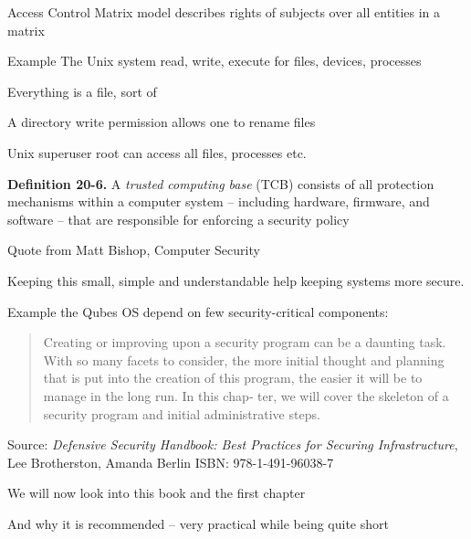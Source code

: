 \documentclass[Screen16to9,17pt]{foils}
\begin{document}

\begin{list1}
\item Access Control Matrix model describes rights of subjects over all entities in a matrix
\item Example The Unix system read, write, execute for files, devices, processes
\item Everything is a file, sort of
\item A directory write permission allows one to rename files
\item Unix superuser root can access all files, processes etc.
\end{list1}




{\bf Definition 20-6.} A \emph{trusted computing base} (TCB) consists of all protection mechanisms within a computer system -- including hardware, firmware, and software -- that are responsible for enforcing a security policy

Quote from Matt Bishop, Computer Security

Keeping this small, simple and understandable help keeping systems more secure.

Example the Qubes OS depend on few security-critical components:\\




\begin{quote}
Creating or improving upon a security program can be a daunting task. With so
many facets to consider, the more initial thought and planning that is put into the
creation of this program, the easier it will be to manage in the long run. In this chap‐
ter, we will cover the skeleton of a security program and initial administrative steps.
\end{quote}
Source: \emph{Defensive Security Handbook: Best Practices for Securing Infrastructure}, Lee Brotherston, Amanda Berlin ISBN: 978-1-491-96038-7

\begin{list2}
\item We will now look into this book and the first chapter
\item And why it is recommended -- very practical while being quite short
\end{list2}
\end{document}
